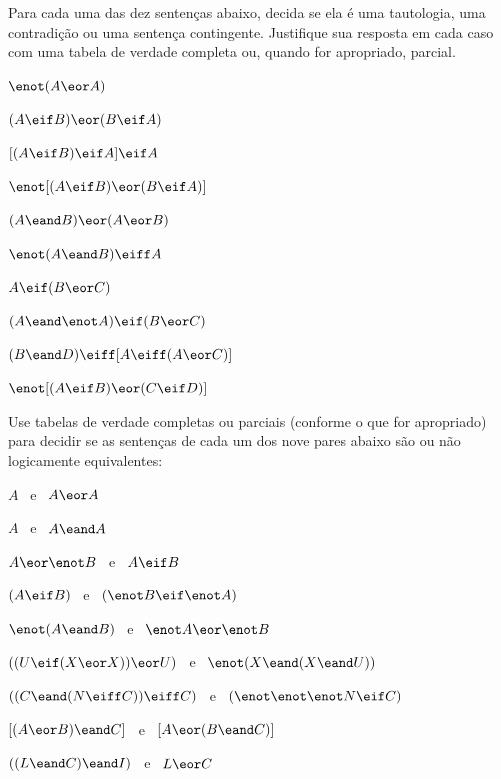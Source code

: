 \noindent\problempart
\label{pr.TT.TTorC4}
Para cada uma das dez sentenças abaixo, decida se ela é uma tautologia, uma contradição ou uma sentença contingente.
Justifique sua resposta em cada caso com uma tabela de verdade completa ou, quando for apropriado, parcial.
\begin{earg}
\item  $\enot (A \eor A)$\vspace{.5ex}							%
\item $(A \eif B) \eor (B \eif A)$\vspace{.5ex}					%
\item $[(A \eif B) \eif A] \eif A$\vspace{.5ex}					%
\item $\enot[( A \eif B) \eor (B \eif A)]$\vspace{.5ex}			%
\item $(A \eand B) \eor (A \eor B)$\vspace{.5ex} 				%
\item $\enot(A\eand B) \eiff A$\vspace{.5ex} 					%
\item $A\eif(B\eor C)$\vspace{.5ex} 							%
\item $(A \eand\enot A) \eif (B \eor C)$\vspace{.5ex} 			%
\item $(B\eand D) \eiff [A \eiff(A \eor C)]$\vspace{.5ex}			%
\item $\enot[(A \eif B) \eor (C \eif D)]$\vspace{.5ex} 			%
\end{earg}


\noindent\problempart
Use tabelas de verdade completas ou parciais (conforme o que for apropriado) para decidir se as sentenças de cada um dos nove pares abaixo são ou não logicamente equivalentes:
\begin{earg}
\item $A$ \ e \ $A \eor A$
\item $A$ \ e \ $A \eand A$
\item $A \eor \enot B$ \ e \ $A\eif B$
\item $(A \eif B)$ \ e \ $(\enot B \eif \enot A)$
\item $\enot(A \eand B)$ \ e \ $\enot A \eor \enot B$
\item $ ((U \eif (X \eor X)) \eor U)$ \ e \ $\enot (X \eand (X \eand U))$
\item $ ((C \eand (N \eiff C)) \eiff C)$ \ e \ $(\enot \enot \enot N \eif C)$
\item $[(A \eor B) \eand C]$ \ e \ $[A \eor (B \eand C)]$
\item $((L \eand C) \eand I)$ \ e \ $L \eor C$
\end{earg}


